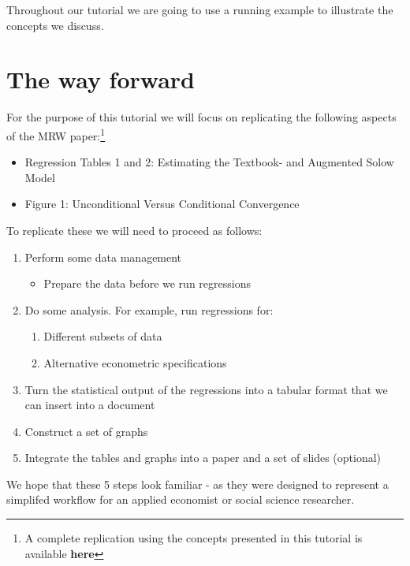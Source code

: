 \documentclass[]{book}
\providecommand{\tightlist}{%
  \setlength{\itemsep}{0pt}\setlength{\parskip}{0pt}}
\let\rmarkdownfootnote\footnote%
\def\footnote{\protect\rmarkdownfootnote}
\theoremstyle{definition}
\theoremstyle{definition}
\theoremstyle{definition}
\theoremstyle{remark}
\begin{document}
Throughout our tutorial we are going to use a running example to
illustrate the concepts we discuss.

\section{The way forward}\label{the-way-forward}

For the purpose of this tutorial we will focus on replicating the
following aspects of the MRW paper:\footnote{A complete replication
  using the concepts presented in this tutorial is available
  \textbf{here}}

\begin{itemize}
\tightlist
\item
  Regression Tables 1 and 2: Estimating the Textbook- and Augmented
  Solow Model
\item
  Figure 1: Unconditional Versus Conditional Convergence
\end{itemize}

To replicate these we will need to proceed as follows:

\begin{enumerate}
\def\labelenumi{\arabic{enumi}.}
\tightlist
\item
  Perform some data management

  \begin{itemize}
  \tightlist
  \item
    Prepare the data before we run regressions
  \end{itemize}
\item
  Do some analysis. For example, run regressions for:

  \begin{enumerate}
  \def\labelenumii{\arabic{enumii}.}
  \tightlist
  \item
    Different subsets of data
  \item
    Alternative econometric specifications
  \end{enumerate}
\item
  Turn the statistical output of the regressions into a tabular format
  that we can insert into a document
\item
  Construct a set of graphs
\item
  Integrate the tables and graphs into a paper and a set of slides
  (optional)
\end{enumerate}

We hope that these 5 steps look familiar - as they were designed to
represent a simplifed workflow for an applied economist or social
science researcher.
\end{document}
